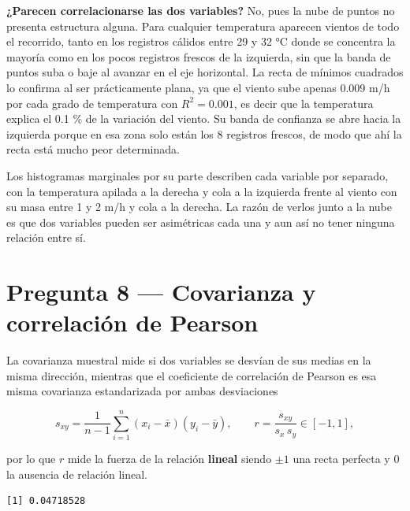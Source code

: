 \documentclass[oneside, openany, fontset=libertinus]{mitthesis}
\newenvironment{Shaded}{\begin{snugshade}}{\end{snugshade}}
\newcommand{\FunctionTok}[1]{\textcolor[rgb]{0.28,0.35,0.67}{#1}}
\newcommand{\NormalTok}[1]{\textcolor[rgb]{0.00,0.23,0.31}{#1}}
\newcommand{\SpecialCharTok}[1]{\textcolor[rgb]{0.37,0.37,0.37}{#1}}
\newenvironment{codres}%
  {\par\smallskip\noindent\begin{minipage}[t]{0.57\linewidth}\vspace{0pt}}%
  {\end{minipage}\par\medskip}
\newcommand{\codressep}{\end{minipage}\hfill\begin{minipage}[t]{0.40\linewidth}\vspace{0pt}}
\begin{document}
\textbf{¿Parecen correlacionarse las dos variables?} No, pues la nube de
puntos no presenta estructura alguna. Para cualquier temperatura
aparecen vientos de todo el recorrido, tanto en los registros cálidos
entre 29 y 32 °C donde se concentra la mayoría como en los pocos
registros frescos de la izquierda, sin que la banda de puntos suba o
baje al avanzar en el eje horizontal. La recta de mínimos cuadrados lo
confirma al ser prácticamente plana, ya que el viento sube apenas 0.009
m/h por cada grado de temperatura con \(R^2 = 0.001\), es decir que la
temperatura explica el 0.1 \% de la variación del viento. Su banda de
confianza se abre hacia la izquierda porque en esa zona solo están los 8
registros frescos, de modo que ahí la recta está mucho peor determinada.

Los histogramas marginales por su parte describen cada variable por
separado, con la temperatura apilada a la derecha y cola a la izquierda
frente al viento con su masa entre 1 y 2 m/h y cola a la derecha. La
razón de verlos junto a la nube es que dos variables pueden ser
asimétricas cada una y aun así no tener ninguna relación entre sí.

\section{Pregunta 8 --- Covarianza y correlación de Pearson}\label{p8}

La covarianza muestral mide si dos variables se desvían de sus medias en
la misma dirección, mientras que el coeficiente de correlación de
Pearson \parencite{pearson1895} es esa misma covarianza estandarizada
por ambas desviaciones

\[
s_{xy} = \frac{1}{n-1}\sum_{i=1}^{n}(x_i - \bar{x})(y_i - \bar{y}),
\qquad
r = \frac{s_{xy}}{s_x \, s_y} \in [-1, 1],
\]

por lo que \(r\) mide la fuerza de la relación \textbf{lineal} siendo
\(\pm 1\) una recta perfecta y \(0\) la ausencia de relación lineal.

\begin{codres}

\begin{Shaded}
\end{Shaded}

\codressep

\begin{verbatim}
[1] 0.04718528
\end{verbatim}

\end{codres}
\end{document}
